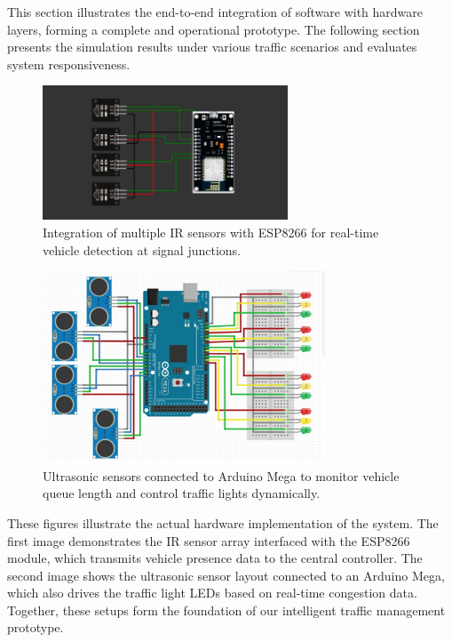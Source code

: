 \documentclass[12pt]{report}
\begin{document}
\vspace{0.5cm}

This section illustrates the end-to-end integration of software with hardware layers, forming a complete and operational prototype. The following section presents the simulation results under various traffic scenarios and evaluates system responsiveness.
\begin{figure}[H]
\centering
\includegraphics[width=0.65\textwidth]{Figures/ir.png}
\caption{Integration of multiple IR sensors with ESP8266 for real-time vehicle detection at signal junctions.}
\label{fig:ir-integration}
\end{figure}

\begin{figure}[H]
\centering
\includegraphics[width=0.75\textwidth]{Figures/us.png}
\caption{Ultrasonic sensors connected to Arduino Mega to monitor vehicle queue length and control traffic lights dynamically.}
\label{fig:us-integration}
\end{figure}

\vspace{0.5cm}

These figures illustrate the actual hardware implementation of the system. The first image demonstrates the IR sensor array interfaced with the ESP8266 module, which transmits vehicle presence data to the central controller. The second image shows the ultrasonic sensor layout connected to an Arduino Mega, which also drives the traffic light LEDs based on real-time congestion data. Together, these setups form the foundation of our intelligent traffic management prototype.
\end{document}
